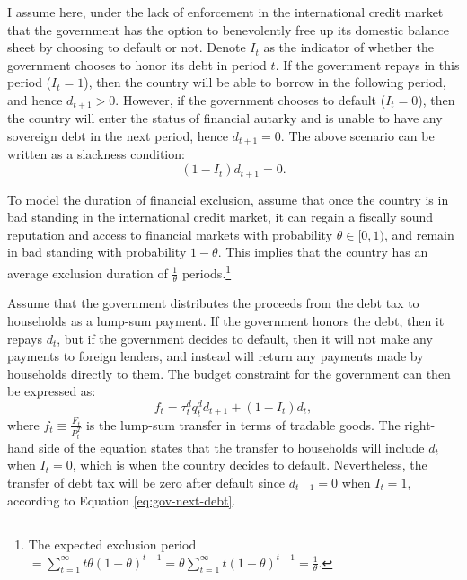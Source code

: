 I assume here, under the lack of enforcement in the international credit market that the government has the option to benevolently free up its domestic balance sheet by choosing to default or not.
Denote $I_t$ as the indicator of whether the government chooses to honor its debt in period $t$. If the government repays in this period ($I_{t} = 1$), then the country will be able to borrow in the following period, and hence $d_{t+1} > 0$. However, if the government chooses to default ($I_t = 0$), then the country will enter the status of financial autarky and is unable to have any sovereign debt in the next period, hence $d_{t+1} = 0$. The above scenario can be written as a slackness condition:
\begin{equation}
    \label{eq:gov-next-debt}
    (1 - I_t)d_{t+1} = 0 .
\end{equation}

To model the duration of financial exclusion, assume that once the country is in bad standing in the international credit market, it can regain a fiscally sound reputation and access to financial markets with probability $\theta \in [0,1)$, and remain in bad standing with probability $1-\theta$. This implies that the country has an average exclusion duration of $\frac{1}{\theta}$ periods.\footnote{
    The expected exclusion period $= \sum_{t=1}^{\infty} t \theta (1-\theta)^{t-1} = \theta  \sum_{t=1}^{\infty} t (1-\theta)^{t-1} = \frac{1}{\theta}$.
}

Assume that the government distributes the proceeds from the debt tax to households as a lump-sum payment. If the government honors the debt, then it repays $d_t$, but if the government decides to default, then it will not make any payments to foreign lenders, and instead will return any payments made by households directly to them. The budget constraint for the government can then be expressed as:
\begin{equation}
    \label{eq:gov-budget}
    f_t = \tau_t^d q_t^d d_{t+1} + (1-I_t)d_t,
\end{equation}
where $f_t \equiv \frac{F_t}{P^T_t}$ is the lump-sum transfer in terms of tradable goods. The right-hand side of the equation states that the transfer to households will include $d_t$ when $I_t = 0$, which is when the country decides to default. Nevertheless, the transfer of debt tax will be zero after default since $d_{t+1} = 0$ when $I_t = 1$, according to Equation \eqref{eq:gov-next-debt}.